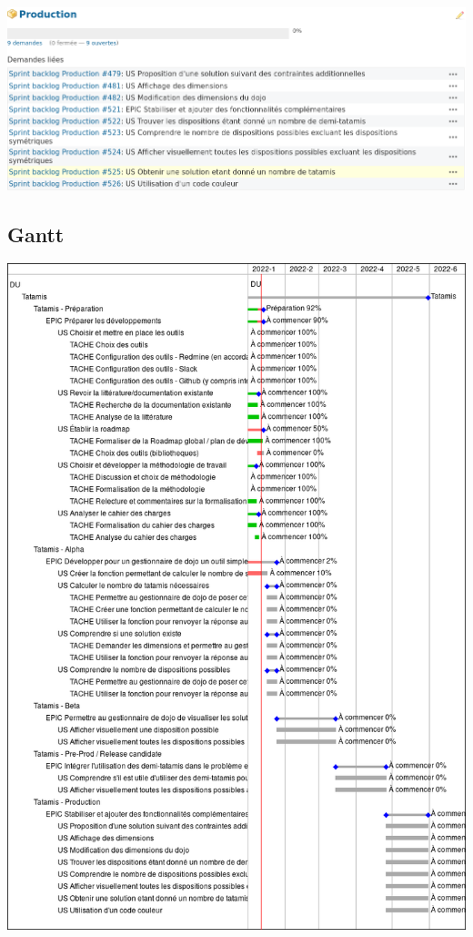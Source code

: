 \includegraphics[scale=0.5]{images/roadmap_prod.png}

\subsection{Gantt}
\includegraphics[scale=0.5]{images/tatamis-gantt.png}
